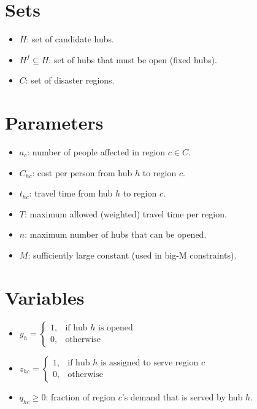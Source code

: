 \documentclass{article}
\begin{document}
\section{Sets}
\begin{itemize}[leftmargin=*,nosep]
    \item $H$: set of candidate hubs.
    \item $H^f \subseteq H$: set of hubs that must be open (fixed hubs).
    \item $C$: set of disaster regions.
\end{itemize}

\section{Parameters}
\begin{itemize}[leftmargin=*,nosep]
    \item $a_c$: number of people affected in region $c \in C$.
    \item $C_{hc}$: cost per person from hub $h$ to region $c$.
    \item $t_{hc}$: travel time from hub $h$ to region $c$.
    \item $T$: maximum allowed (weighted) travel time per region.
    \item $n$: maximum number of hubs that can be opened.
    \item $M$: sufficiently large constant (used in big-M constraints).
\end{itemize}

\section{Variables}
\begin{itemize}[leftmargin=*,nosep]
    \item $y_h = \begin{cases}
        1, & \text{if hub } h \text{ is opened} \\
        0, & \text{otherwise}
    \end{cases}$
    
    \item $z_{hc} = \begin{cases}
        1, & \text{if hub } h \text{ is assigned to serve region } c \\
        0, & \text{otherwise}
    \end{cases}$
    
    \item $q_{hc} \geq 0$: fraction of region $c$'s demand that is served by hub $h$.
\end{itemize}
\end{document}
